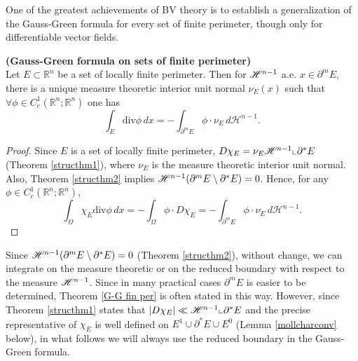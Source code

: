 One of the greatest achievements of BV theory is to establish a generalization of the Gauss-Green formula for every set of finite perimeter, though only for differentiable vector fields. 

\begin{theorem} \label{G-G fin per} {\bf (Gauss-Green formula on sets of finite perimeter)}
\\
Let $E \subset \mathbb{R}^{n}$ be a set of locally finite perimeter. Then for $\mathscr{H}^{n-1}$ a.e. $x \in \partial^{m} E$, there is a unique measure theoretic interior unit normal $\nu_{E}(x)$ such that $\forall \phi \in C_{c}^{1}(\mathbb{R}^{n}; \mathbb{R}^{n})$ one has
\[ \int_{E} \mathrm{div}\phi\, dx = - \int_{\partial^{m} E} \phi \cdot \nu_{E}\, d\mathcal{H}^{n-1}. \]
\end{theorem}
\begin{proof} Since $E$ is a set of locally finite perimeter, $D \chi_{E} = \nu_{E} \mathscr{H}^{n - 1} \llcorner \partial^{*} E$ (Theorem \ref{structhm1}), where $\nu_{E}$ is the measure theoretic interior unit normal. Also, Theorem \ref{structhm2} implies $\mathscr{H}^{n - 1}(\partial^{m} E \setminus \partial^{*} E) = 0$. Hence, for any $\phi \in C^{1}_{c}(\mathbb{R}^{n}; \mathbb{R}^{n})$,
\[ \int_{\Omega} \chi_{E} \mathrm{div}\phi\, dx = - \int_{\Omega} \phi \cdot D \chi_{E} = - \int_{\partial^{m} E} \phi \cdot \nu_{E}\, d\mathcal{H}^{n-1}. \]
\end{proof}

\begin{remark} Since $\mathscr{H}^{n - 1} (\partial^{m} E \setminus \partial^{*} E) = 0$ (Theorem \ref{structhm2}), without change, we can integrate on the measure theoretic or on the reduced boundary with respect to the measure $\mathscr{H}^{n - 1}$. Since in many practical cases $\partial^{m} E$ is easier to be determined, Theorem \ref{G-G fin per} is often stated in this way. However, since Theorem \ref{structhm1} states that $|D \chi_{E}| \ll \mathscr{H}^{n - 1} \llcorner \partial^{*} E$ and the precise representative of $\chi_{E}$ is well defined on $E^{1} \cup \partial^{*}E \cup E^{0}$ (Lemma \ref{mollcharconv} below), in what follows we will always use the reduced boundary in the Gauss-Green formula.
\end{remark}

